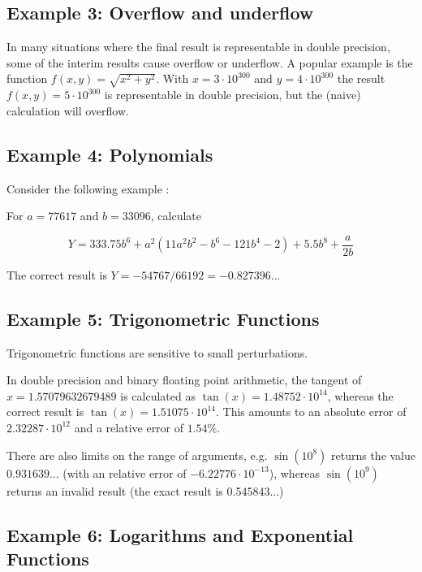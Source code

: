 \subsection{Example 3: Overflow and underflow}

In many situations where the final result is representable in double precision, some of the interim results cause overflow or underflow. A popular example is the function $f(x,y) = \sqrt{x^2+y^2}$. With $x=3 \cdot 10^{300}$ and $y=4 \cdot 10^{300}$ the result $f(x,y) = 5 \cdot 10^{300}$ is representable in double precision, but the (naive) calculation will overflow.



\subsection{Example 4: Polynomials}

Consider the following example \cite{Cuyt_2001}: 

\vpara
For $a=77617$ and $b=33096$, calculate

\begin{equation}
Y = 333.75 b^6 + a^2  (11 a^2  b^2 - b^6 - 121 b^4 - 2) + 5.5  b^8 + \frac{a}{2b} 
\end{equation}

The correct result is $Y = -54767 / 66192 = -0.827396...$




\subsection{Example 5: Trigonometric Functions}

Trigonometric functions are sensitive to small perturbations. 

\vpara
In double precision and binary floating point arithmetic, the tangent of $x = 1.57079632679489$ is calculated as $\tan(x) = 1.48752 \cdot 10^{14}$, whereas the correct result is $\tan(x) = 1.51075 \cdot 10^{14}$. This amounts to an absolute error of $2.32287  \cdot 10^{12}$ and a relative error of $1.54\%$.

\vpara
There are also limits on the range of arguments, e.g. $\sin(10^{8})$ returns the value $0.931639...$ (with an relative error of $-6.22776 \cdot 10^{-13}$), whereas  $\sin(10^{9})$ returns an invalid result (the exact result is 0.545843...)





\subsection{Example 6: Logarithms and Exponential Functions}


